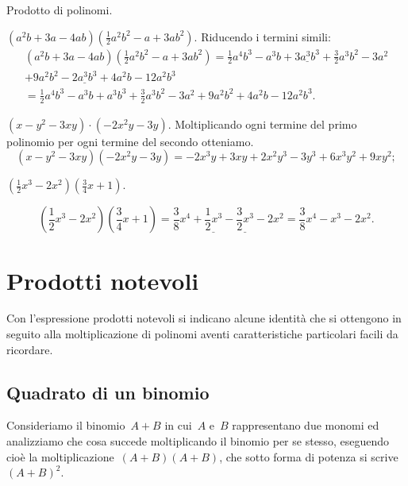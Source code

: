 \begin{exrig}
 \begin{esempio}
 Prodotto di polinomi.

 \begin{enumeratea}
   \item 
$\left(a^{2}b+3a-4{ab}\right)\left(\frac{1}{2}a^{2}b^{2}-a+3{ab}^{2}
\right).$ Riducendo i termini simili:
 \begin{multline*}
\left(a^{2}b+3a-4{ab}\right)\left(\frac{1}{2}a^{2}b^{2}-a+3{ab}^{2}\right)=%
\frac{1}{2}a^{4}b^{3}-a^{3}b+\underline{3a^{3}b^{3}}+\frac{3}{2}a^{3}b^{2}
-3a^{2}\\
   +9a^{2}b^{2} -\underline{2a^{3}b^{3}}+4a^{2}b-12a^{2}b^{3}\\
=\frac{1}{2}a^{4}b^{3}-a^{3}b+a^{3}b^{3}+\frac{3}{2}a^{3}b^{2}-3a^{2}+9a^{2}
b^{2}+4a^{2}b-12a^{2}b^{3}.
 \end{multline*}
 \item  $\left(x-y^{2}-3{xy}\right)\cdot \left(-2x^{2}y-3y\right).$
 Moltiplicando ogni termine del primo polinomio per ogni termine del
secondo otteniamo.
\[\left(x-y^{2}-3{xy}\right)\left(-2x^{2}y-3y\right)=-2x^{3}y+3{xy}+2x^{2}y^
{3}-3y^{3}+6x^{3}y^{2}+9{xy}^{2};\]

 \item $\left(\frac{1}{2}x^{3}-2x^{2}\right)\left(\frac{3}{4}x+1\right)$.
 
\[\left(\frac{1}{2}x^{3}-2x^{2}\right)\left(\frac{3}{4}x+1\right)=\frac{3}{8
}x^{4}+\underline{\frac{1}{2}x^{3}}-\underline{\frac{3}{2}x^{3}}-2x^{2}
=\frac{3}{8}x^{4}-x^{3}-2x^{2}.\]
 \end{enumeratea}
 \end{esempio}
\end{exrig}

\section{Prodotti notevoli}

Con l'espressione prodotti notevoli si indicano alcune
identità che si ottengono in seguito alla moltiplicazione di polinomi
aventi caratteristiche particolari facili da ricordare.

\subsection{Quadrato di un binomio}
\label{subsec:11_prodnot_quadratobinomio}

Consideriamo il binomio~$A+B$ in cui~$A$ e~$B$ rappresentano due monomi ed
analizziamo che cosa succede moltiplicando il binomio per se
stesso, eseguendo cioè la
moltiplicazione~$\left(A+B\right)\left(A+B\right)$, che sotto forma di 
potenza si scrive~$\left(A+B\right)^{2}$.

